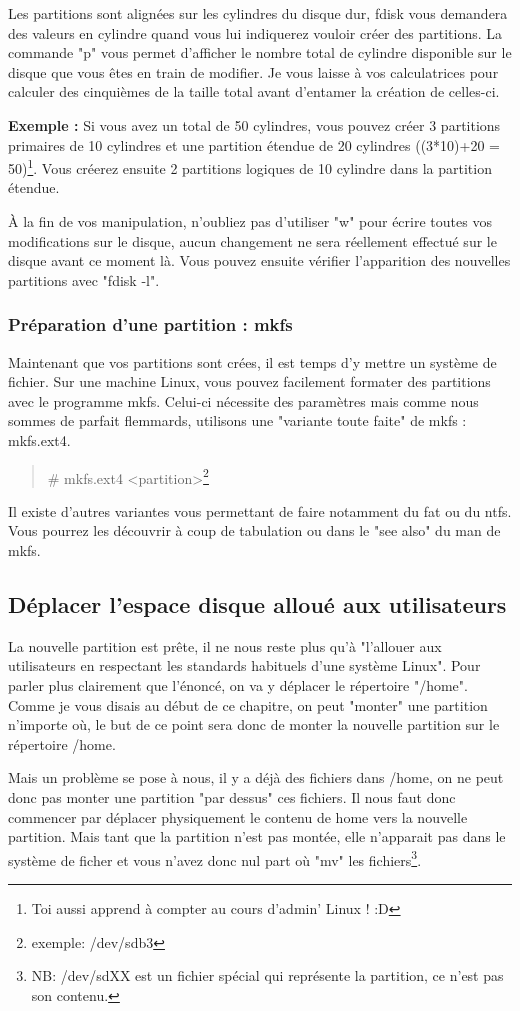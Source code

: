 \documentclass[a4paper,11pt]{article}
\newcommand{\commande}[1] {
    \begin{quote}
    \tt\raggedright #1 
    \end{quote}
}
\begin{document}
\par Les partitions sont alignées sur les cylindres du disque dur, fdisk vous demandera des valeurs en cylindre quand vous lui indiquerez vouloir créer des partitions. La commande "p" vous permet d'afficher le nombre total de cylindre disponible sur le disque que vous êtes en train de modifier. Je vous laisse à vos calculatrices pour calculer des cinquièmes de la taille total avant d'entamer la création de celles-ci.
\par \textbf{Exemple :} Si vous avez un total de 50 cylindres, vous pouvez créer 3 partitions primaires de 10 cylindres et une partition étendue de 20 cylindres ((3*10)+20 = 50)\footnote{Toi aussi apprend à compter au cours d'admin' Linux ! :D}. Vous créerez ensuite 2 partitions logiques de 10 cylindre dans la partition étendue.
\par À la fin de vos manipulation, n'oubliez pas d'utiliser "w" pour écrire toutes vos modifications sur le disque, aucun changement ne sera réellement effectué sur le disque avant ce moment là. Vous pouvez ensuite vérifier l'apparition des nouvelles partitions avec "fdisk -l".

\subsubsection{Préparation d'une partition : mkfs}
\par Maintenant que vos partitions sont crées, il est temps d'y mettre un système de fichier. Sur une machine Linux, vous pouvez facilement formater des partitions avec le programme mkfs. Celui-ci nécessite des paramètres mais comme nous sommes de parfait flemmards, utilisons une "variante toute faite" de mkfs : mkfs.ext4.
\commande{\# mkfs.ext4 <partition>\footnote{exemple: /dev/sdb3}}
\par Il existe d'autres variantes vous permettant de faire notamment du fat ou du ntfs. Vous pourrez les découvrir à coup de tabulation ou dans le "see also" du man de mkfs.

\subsection{Déplacer l'espace disque alloué aux utilisateurs}
\par La nouvelle partition est prête, il ne nous reste plus qu'à "l'allouer aux utilisateurs en respectant les standards habituels d'une système Linux". Pour parler plus clairement que l'énoncé, on va y déplacer le répertoire "/home". Comme je vous disais au début de ce chapitre, on peut "monter" une partition n'importe où, le but de ce point sera donc de monter la nouvelle partition sur le répertoire /home.
\par Mais un problème se pose à nous, il y a déjà des fichiers dans /home, on ne peut donc pas monter une partition "par dessus" ces fichiers. Il nous faut donc commencer par déplacer physiquement le contenu de home vers la nouvelle partition. Mais tant que la partition n'est pas montée, elle n'apparait pas dans le système de ficher et vous n'avez donc nul part où "mv" les fichiers\footnote{NB: /dev/sdXX est un fichier spécial qui représente la partition, ce n'est pas son contenu.}.
\end{document}
